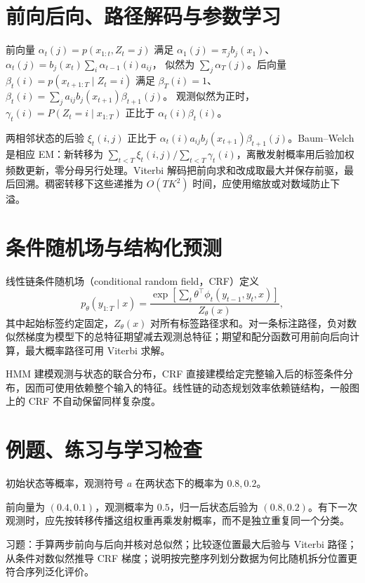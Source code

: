 \section{前向后向、路径解码与参数学习}

前向量 $\alpha_t(j)=p(x_{1:t},Z_t=j)$ 满足
$\alpha_1(j)=\pi_jb_j(x_1)$、
$\alpha_t(j)=b_j(x_t)\sum_i\alpha_{t-1}(i)a_{ij}$，
似然为 $\sum_j\alpha_T(j)$。后向量 $\beta_t(i)=p(x_{t+1:T}\mid Z_t=i)$ 满足
$\beta_T(i)=1$、
$\beta_t(i)=\sum_ja_{ij}b_j(x_{t+1})\beta_{t+1}(j)$。
观测似然为正时，$\gamma_t(i)=P(Z_t=i\mid x_{1:T})$ 正比于 $\alpha_t(i)\beta_t(i)$。

两相邻状态的后验 $\xi_t(i,j)$ 正比于 $\alpha_t(i)a_{ij}b_j(x_{t+1})\beta_{t+1}(j)$。Baum--Welch 是相应 EM：新转移为 $\sum_{t<T}\xi_t(i,j)/\sum_{t<T}\gamma_t(i)$，离散发射概率用后验加权频数更新，零分母另行处理。Viterbi 解码把前向求和改成取最大并保存前驱，最后回溯。稠密转移下这些递推为 $O(TK^2)$ 时间，应使用缩放或对数域防止下溢。

\section{条件随机场与结构化预测}

线性链条件随机场（conditional random field，CRF）定义
\begin{equation}
 p_\theta(y_{1:T}\mid x)=
 \frac{\exp[\sum_t\theta^\top\phi_t(y_{t-1},y_t,x)]}{Z_\theta(x)},
 \label{eq:ml-crf}
\end{equation}
其中起始标签约定固定，$Z_\theta(x)$ 对所有标签路径求和。对一条标注路径，负对数似然梯度为模型下的总特征期望减去观测总特征；期望和配分函数可用前向后向计算，最大概率路径可用 Viterbi 求解。

HMM 建模观测与状态的联合分布，CRF 直接建模给定完整输入后的标签条件分布，因而可使用依赖整个输入的特征。线性链的动态规划效率依赖链结构，一般图上的 CRF 不自动保留同样复杂度。

\section{例题、练习与学习检查}

\begin{example}[两状态的一步滤波]
初始状态等概率，观测符号 $a$ 在两状态下的概率为 $0.8,0.2$。
\end{example}
\begin{solve}
前向量为 $(0.4,0.1)$，观测概率为 $0.5$，归一后状态后验为 $(0.8,0.2)$。有下一次观测时，应先按转移传播这组权重再乘发射概率，而不是独立重复同一个分类。
\end{solve}

习题：手算两步前向与后向并核对总似然；比较逐位置最大后验与 Viterbi 路径；从条件对数似然推导 CRF 梯度；说明按完整序列划分数据为何比随机拆分位置更符合序列泛化评价。





